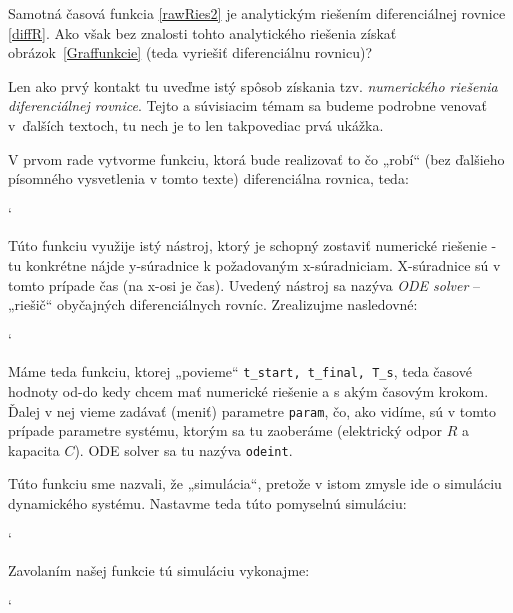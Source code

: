 \documentclass[a4paper, 10pt, ]{article}
\begin{document}
Samotná časová funkcia \eqref{rawRies2} je analytickým riešením diferenciálnej rovnice \eqref{diffR}. Ako však bez znalosti tohto analytického riešenia získať obrázok~\ref{Graffunkcie} (teda vyriešiť diferenciálnu rovnicu)?

Len ako prvý kontakt tu uveďme istý spôsob získania tzv. \emph{numerického riešenia diferenciálnej rovnice}. Tejto a súvisiacim témam sa budeme podrobne venovať v~ďalších textoch, tu nech je to len takpovediac prvá ukážka.

V prvom rade vytvorme funkciu, ktorá bude realizovať to čo „robí“ (bez ďalšieho písomného vysvetlenia v tomto texte) diferenciálna rovnica, teda:

{\catcode`

}

Túto funkciu využije istý nástroj, ktorý je schopný zostaviť numerické riešenie - tu konkrétne nájde y-súradnice k požadovaným x-súradniciam. X-súradnice sú v tomto prípade čas (na x-osi je čas). Uvedený nástroj sa nazýva \emph{ODE solver} -- „riešič“ obyčajných diferenciálnych rovníc. Zrealizujme nasledovné:

{\catcode`

}

Máme teda funkciu, ktorej „povieme“ \lstinline|t_start, t_final, T_s|, teda časové hodnoty od-do kedy chcem mať numerické riešenie a s akým časovým krokom. Ďalej v nej vieme zadávať (meniť) parametre \lstinline|param|, čo, ako vidíme, sú v tomto prípade parametre systému, ktorým sa tu zaoberáme (elektrický odpor $R$ a kapacita $C$). ODE solver sa tu nazýva \lstinline|odeint|.

Túto funkciu sme nazvali, že „simulácia“, pretože v istom zmysle ide o simuláciu dynamického systému. Nastavme teda túto pomyselnú simuláciu:

{\catcode`

}

Zavolaním našej funkcie tú simuláciu vykonajme:

{\catcode`

}
\end{document}
